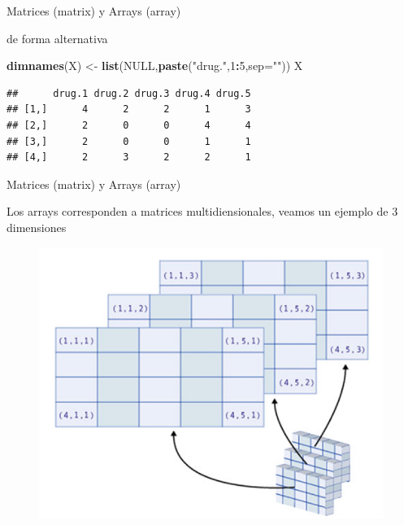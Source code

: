 \documentclass[ignorenonframetext,]{beamer}
\newenvironment{Shaded}{\begin{snugshade}}{\end{snugshade}}
\newcommand{\KeywordTok}[1]{\textcolor[rgb]{0.13,0.29,0.53}{\textbf{#1}}}
\newcommand{\DataTypeTok}[1]{\textcolor[rgb]{0.13,0.29,0.53}{#1}}
\newcommand{\DecValTok}[1]{\textcolor[rgb]{0.00,0.00,0.81}{#1}}
\newcommand{\StringTok}[1]{\textcolor[rgb]{0.31,0.60,0.02}{#1}}
\newcommand{\OtherTok}[1]{\textcolor[rgb]{0.56,0.35,0.01}{#1}}
\newcommand{\OperatorTok}[1]{\textcolor[rgb]{0.81,0.36,0.00}{\textbf{#1}}}
\newcommand{\NormalTok}[1]{#1}
\begin{document}
\begin{frame}[fragile]{Matrices (matrix) y Arrays (array)}

de forma alternativa

\begin{Shaded}
\begin{Highlighting}[]
\KeywordTok{dimnames}\NormalTok{(X) <-}\StringTok{ }\KeywordTok{list}\NormalTok{(}\OtherTok{NULL}\NormalTok{,}\KeywordTok{paste}\NormalTok{(}\StringTok{"drug."}\NormalTok{,}\DecValTok{1}\OperatorTok{:}\DecValTok{5}\NormalTok{,}\DataTypeTok{sep=}\StringTok{""}\NormalTok{))}
\NormalTok{X}
\end{Highlighting}
\end{Shaded}

\begin{verbatim}
##      drug.1 drug.2 drug.3 drug.4 drug.5
## [1,]      4      2      2      1      3
## [2,]      2      0      0      4      4
## [3,]      2      0      0      1      1
## [4,]      2      3      2      2      1
\end{verbatim}

\end{frame}

\begin{frame}{Matrices (matrix) y Arrays (array)}

Los arrays corresponden a matrices multidiensionales, veamos un ejemplo
de 3 dimensiones

\begin{center}
\begin{figure}
\includegraphics[scale=0.4]{array.png}
\end{figure}
\end{center}

\end{frame}
\end{document}
